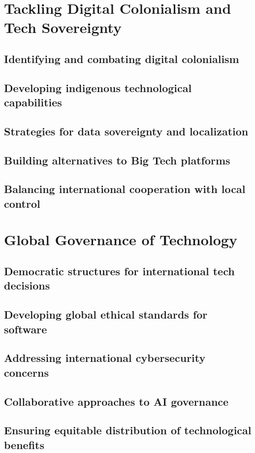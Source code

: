 \newpage

\section{Tackling Digital Colonialism and Tech Sovereignty}
\subsection{Identifying and combating digital colonialism}
\subsection{Developing indigenous technological capabilities}
\subsection{Strategies for data sovereignty and localization}
\subsection{Building alternatives to Big Tech platforms}
\subsection{Balancing international cooperation with local control}

\newpage

\section{Global Governance of Technology}
\subsection{Democratic structures for international tech decisions}
\subsection{Developing global ethical standards for software}
\subsection{Addressing international cybersecurity concerns}
\subsection{Collaborative approaches to AI governance}
\subsection{Ensuring equitable distribution of technological benefits}

